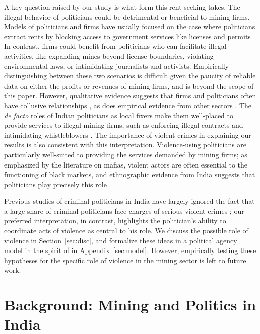 \documentclass[12pt,letterpaper]{article}
\begin{document}
A key question raised by our study is what form this rent-seeking
takes. The illegal behavior of politicians could be detrimental or
beneficial to mining firms. Models of politicians and firms have
usually focused on the case where politicians extract rents by
blocking access to government services like licenses and permits
\cite{Shleifer1994}. In contrast, firms could benefit from politicians
who can facilitate illegal activities, like expanding mines beyond
license boundaries, violating environmental laws, or intimidating
journalists and activists. Empirically distinguishing between these
two scenarios is difficult given the paucity of reliable data on
either the profits or revenues of mining firms, and is beyond the
scope of this paper. However, qualitative evidence suggests that firms
and politicians often have collusive relationships
\cite{Bhowmick2011,Paul2015}, as does empirical evidence from other
sectors \cite{lehne2016}. The \textit{de facto} roles of Indian
politicians as local fixers make them well-placed to provide services
to illegal mining firms, such as enforcing illegal contracts and
intimidating whistleblowers \cite{Chopra1996,Jensenius2013a}.  The
importance of violent crimes in explaining our results is also
consistent with this interpretation. Violence-using politicians are
particularly well-suited to providing the services demanded by mining
firms; as emphasized by the literature on mafias, violent actors are
often essential to the functioning of black markets, and ethnographic evidence from India suggests that politicians play precisely this role
\cite{Gambetta1996,Bandiera2003,Berenschot2011,Skarbek2011,Chimeli2011,Vaishnav2017}.

Previous studies of criminal politicians in India have largely ignored
the fact that a large share of criminal politicians face charges of
serious violent crimes \cite{Prakash2014,Fisman2013}; our preferred
interpretation, in contrast, highlights the politician's ability to
coordinate acts of violence as central to his role. We discuss the
possible role of violence in Section~\ref{sec:disc}, and formalize
these ideas in a political agency model in the spirit of
 in Appendix~\ref{sec:model}.  However,
empirically testing these hypotheses for the specific role of violence
in the mining sector is left to future work.

\section{Background: Mining and Politics in India}
\label{sec:bg}
\end{document}
